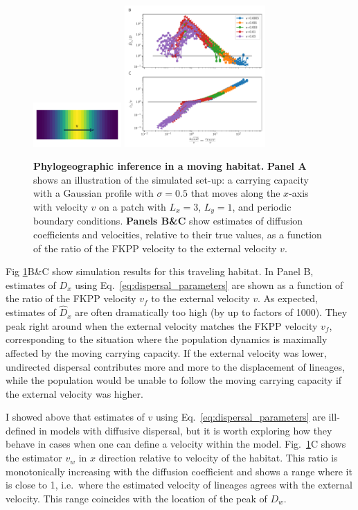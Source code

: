 \documentclass[aps,rmp, twocolumn]{revtex4}
\newcommand{\vfkpp}{v_f}
\begin{document}
\begin{figure}
    \includegraphics[width=0.3\textwidth]{figures/traveling_wave}
    \includegraphics[width=0.48\textwidth]{figures/waves}
    \caption{\label{fig:traveling_wave}{\bf Phylogeographic inference in a moving habitat.}
    {\bf Panel A} shows an illustration of the simulated set-up: a carrying capacity with a Gaussian profile with $\sigma=0.5$ that moves along the $x$-axis with velocity $v$ on a patch with $L_x=3$, $L_y=1$, and periodic boundary conditions.
    {\bf Panels B\&C} show estimates of diffusion coefficients and velocities, relative to their true values, as a function of the ratio of the FKPP velocity to the external velocity $v$. }
\end{figure}


Fig \ref{fig:traveling_wave}B\&C show simulation results for this traveling habitat. In Panel B, estimates of $D_x$ using Eq.~\ref{eq:dispersal_parameters} are shown as a function of the ratio of the FKPP velocity $v_f$ to the external velocity $v$.
As expected, estimates of $\hat{D}_x$ are often dramatically too high (by up to factors of 1000).
They peak right around when the external velocity matches the FKPP velocity $\vfkpp$, corresponding to the situation where the population dynamics is maximally affected by the moving carrying capacity.
If the external velocity was lower, undirected dispersal contributes more and more to the displacement of lineages, while the population would be unable to follow the moving carrying capacity if the external velocity was higher.

I showed above that  estimates of $v$ using Eq.~\ref{eq:dispersal_parameters} are ill-defined in models with diffusive dispersal, but it is worth exploring how they behave in cases when one can define a velocity within the model.
Fig.~\ref{fig:traveling_wave}C shows the estimator $v_w$ in $x$ direction relative to velocity of the habitat.
This ratio is monotonically increasing with the diffusion coefficient and shows a range where it is close to 1, i.e.~where the estimated velocity of lineages agrees with the external velocity.
This range coincides with the location of the peak of $D_w$.
\end{document}
